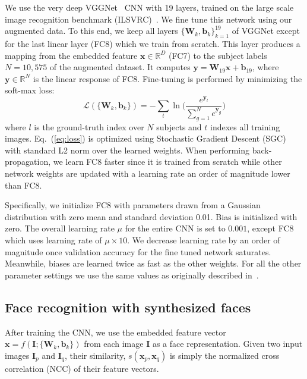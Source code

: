 \documentclass[runningheads]{llncs}
\def\mbf#1{\mathbf{#1}}
\def\mit#1{\mathit{#1}}
\newcommand{\minisection}[1]{\vspace{0.04in} \noindent {\bf #1:} }
\begin{document}
\minisection{CNN fine-tuning}\label{sec:finetune}
We use the very deep VGGNet~\cite{Simonyan2015very} CNN with 19 layers, trained on the large scale image recognition benchmark (ILSVRC)~\cite{russakovsky2014imagenet}. We fine tune this network using our augmented data. To this end, we keep all layers $\{\mbf{W}_k,\mbf{b}_k\}_{k=1}^{19}$ of VGGNet except for the last linear layer (FC8) which we train from scratch. This layer produces a mapping from the embedded feature $\mbf{x} \in \mathbb{R}^{D}$ (FC7) to the subject labels $N=10,575$ of the augmented dataset. It  computes $\mbf{y}=\mbf{W}_{19}\mbf{x}+\mbf{b}_{19}$, where $\mbf{y} \in \mathbb{R}^{N}$ is the linear response of FC8. Fine-tuning is performed by minimizing the soft-max loss:
\begin{equation}
\mathcal{L}(\{\mbf{W}_k,\mbf{b}_k\}) = - \sum_{t}\ln \bigg( \frac{ \mit{e}^{\mbf{y}_{l}} }{\sum_{g=1}^{N}\mit{e}^{\mbf{y}_g} } \bigg) 
\label{eq:loss}
\end{equation}
where $l$ is the ground-truth index over $N$ subjects and $t$ indexes all training images. Eq.~(\ref{eq:loss}) is optimized using Stochastic Gradient Descent (SGC) with standard L2 norm over the learned weights. When performing back-propagation, we learn FC8 faster since it is trained from scratch while other network weights are updated with a learning rate an order of magnitude lower than FC8. 

Specifically, we initialize FC8 with parameters drawn from a Gaussian distribution with zero mean and standard deviation 0.01. Bias is initialized with zero. The overall learning rate $\mu$ for the entire CNN is set to $0.001$, except FC8 which uses learning rate of $\mu\times10$. We decrease learning rate by an order of magnitude once validation accuracy for the fine tuned network saturates.  Meanwhile, biases are learned twice as fast as the other weights. For all the other parameter settings we use the same values as originally described in~\cite{krizhevsky2012imagenet}.


\subsection{Face recognition with synthesized faces}\label{sec:matching}

\minisection{General matching process}\label{sec:generalMatch}
After training the CNN, we use the embedded feature vector $\mbf{x} = f(\mbf{I};\{\mbf{W}_k,\mbf{b}_k\} )$ 
from each image $\mbf{I}$ as a face representation. Given two input images $\mbf{I}_p$ and $\mbf{I}_q$, their similarity, $s(\mbf{x}_p, \mbf{x}_q)$ is simply the normalized cross correlation (NCC) of their feature vectors. 
\end{document}

